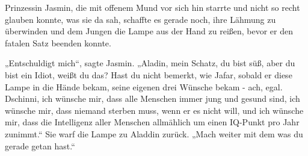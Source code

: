 {%
Prinzessin Jasmin, die mit offenem Mund vor sich hin starrte und nicht so recht glauben konnte, was sie da sah, schaffte es gerade noch, ihre Lähmung zu überwinden und dem Jungen die Lampe aus der Hand zu reißen, bevor er den fatalen Satz beenden konnte.

„Entschuldigt mich“, sagte Jasmin. „Aladin, mein Schatz, du bist süß, aber du bist ein Idiot, weißt du das? Hast du nicht bemerkt, wie Jafar, sobald er diese Lampe in die Hände bekam, seine eigenen drei Wünsche bekam - ach, egal. Dschinni, ich wünsche mir, dass alle Menschen immer jung und gesund sind, ich wünsche mir, dass niemand sterben muss, wenn er es nicht will, und ich wünsche mir, dass die Intelligenz aller Menschen allmählich um einen IQ-Punkt pro Jahr zunimmt.“ Sie warf die Lampe zu Aladdin zurück. „Mach weiter mit dem was du gerade getan hast.“

%

}
